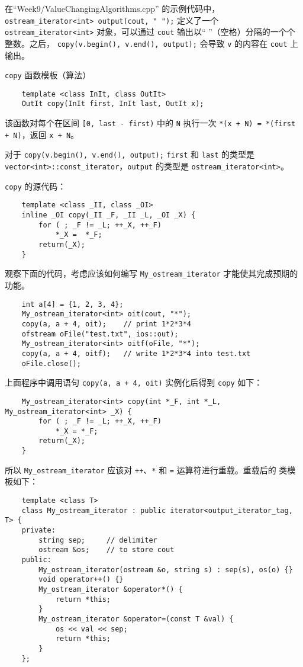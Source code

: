 \documentclass[UTF8]{ctexart}
\begin{document}
在``Week9/ValueChangingAlgorithms.cpp'' 的示例代码中，
\texttt{ostream_iterator<int> output(cout, " ");} 定义了一个 \texttt{ostream\_iterator<int>}
对象，可以通过 \texttt{cout} 输出以“ ”（空格）分隔的一个个整数。之后，
\texttt{copy(v.begin(), v.end(), output);} 会导致 \texttt{v} 的内容在 \texttt{cout} 上输出。

\texttt{copy} 函数模板（算法）
\begin{verbatim}
    template <class InIt, class OutIt>
    OutIt copy(InIt first, InIt last, OutIt x);
\end{verbatim}
该函数对每个在区间 \texttt{[0, last - first)} 中的 \texttt{N} 执行一次
\texttt{*(x + N) = *(first + N)}，返回 \texttt{x + N}。

对于 \texttt{copy(v.begin(), v.end(), output);} \texttt{first} 和 \texttt{last} 的类型是
\texttt{vector<int>::const\_iterator}，\texttt{output} 的类型是 \texttt{ostream\_iterator<int>}。

\texttt{copy} 的源代码：
\begin{verbatim}
    template <class _II, class _OI>
    inline _OI copy(_II _F, _II _L, _OI _X) {
        for ( ; _F != _L; ++_X, ++_F)
            *_X =  *_F;
        return(_X);
    }
\end{verbatim}

观察下面的代码，考虑应该如何编写 \texttt{My\_ostream\_iterator} 才能使其完成预期的功能。
\begin{verbatim}
    int a[4] = {1, 2, 3, 4};
    My_ostream_iterator<int> oit(cout, "*");
    copy(a, a + 4, oit);    // print 1*2*3*4
    ofstream oFile("test.txt", ios::out);
    My_ostream_iterator<int> oitf(oFile, "*");
    copy(a, a + 4, oitf);   // write 1*2*3*4 into test.txt
    oFile.close();
\end{verbatim}

上面程序中调用语句 \texttt{copy(a, a + 4, oit)} 实例化后得到 \texttt{copy} 如下：
\begin{verbatim}
    My_ostream_iterator<int> copy(int *_F, int *_L, My_ostream_iterator<int> _X) {
        for ( ; _F != _L; ++_X, ++_F)
            *_X = *_F;
        return(_X);
    }
\end{verbatim}
所以 \texttt{My\_ostream\_iterator} 应该对 \texttt{++}、\texttt{*} 和 \texttt{=} 运算符进行重载。重载后的
类模板如下：
\begin{verbatim}
    template <class T>
    class My_ostream_iterator : public iterator<output_iterator_tag, T> {
    private:
        string sep;     // delimiter
        ostream &os;    // to store cout
    public:
        My_ostream_iterator(ostream &o, string s) : sep(s), os(o) {}
        void operator++() {}
        My_ostream_iterator &operator*() {
            return *this;
        }
        My_ostream_iterator &operator=(const T &val) {
            os << val << sep;
            return *this;
        }
    };
\end{verbatim}
\end{document}
